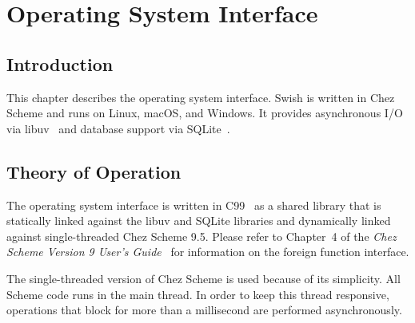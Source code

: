 %
%
%

\chapter {Operating System Interface}\label{chap:osi}

\section {Introduction}

This chapter describes the operating system interface. Swish is
written in Chez Scheme and runs on Linux, macOS, and Windows. It
provides asynchronous I/O via libuv~\cite{libuv} and database support
via SQLite~\cite{sqlite-guide}.

\section {Theory of Operation}

The operating system interface is written in C99~\cite{c99} as a
shared library that is statically linked against the libuv and SQLite
libraries and dynamically linked against single-threaded Chez Scheme
9.5.  Please refer to Chapter~4 of the \emph{Chez Scheme Version 9
  User's Guide}~\cite{chez-scheme-users-guide} for information on the
foreign function interface.

The single-threaded version of Chez Scheme is used because of its
simplicity. All Scheme code runs in the main thread. In order to keep
this thread responsive, operations that block for more than a
millisecond are performed asynchronously.

